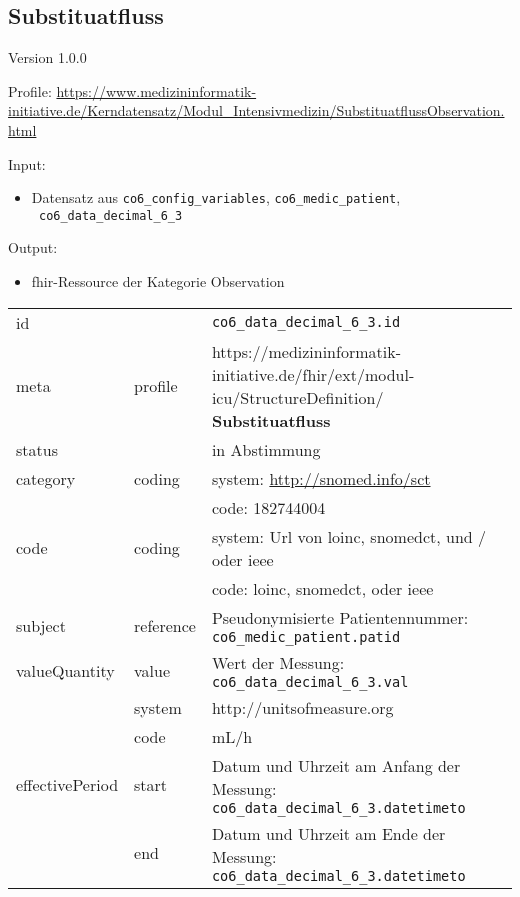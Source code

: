 \subsection{Substituatfluss} 
\noindent Version 1.0.0

\noindent Profile: \url{https://www.medizininformatik-initiative.de/Kerndatensatz/Modul_Intensivmedizin/SubstituatflussObservation.html}

\noindent Input:
\begin{itemize}
	\item Datensatz aus \texttt{co6\_config\_variables}, \texttt{co6\_medic\_patient}, \\ \texttt{
co6\_data\_decimal\_6\_3}
\end{itemize}
Output:
\begin{itemize}
        \item \ac{fhir}-Ressource der Kategorie \glqq Observation\grqq{}
\end{itemize}
\begin{longtable}{|l|l|p{7.5cm}|}
        \hline
        \rowcolor{lightgray} \multicolumn{3}{|l|}{Data Mapping (inhaltlich)} \\ \hline
        id &  & \texttt{co6\_data\_decimal\_6\_3.id} \\ \hline
	meta & profile & https://medizininformatik-initiative.de/fhir/ext/modul-icu/StructureDefinition/\textbf{
Substituatfluss} \\ \hline 
	status &  & in Abstimmung  \\ \hline 
	category & coding & system: \url{http://snomed.info/sct} \\
\cline{3-3}
	& & code: 182744004 \\ \hline
	code & coding & system: Url von \ac{loinc}, \ac{snomedct}, und / oder \ac{ieee} \\ 
	\cline{3-3} 
	 &  & code: \ac{loinc}, \ac{snomedct}, oder \ac{ieee} \\ \hline
	subject & reference & Pseudonymisierte Patientennummer: \texttt{co6\_medic\_patient.patid} \\ \hline
	valueQuantity & value & Wert der Messung: \texttt{
co6\_data\_decimal\_6\_3.val} \\
        \cline{2-3}
         & system & http://unitsofmeasure.org \\
         \cline{2-3}
         & code & mL/h \\ \hline
    effectivePeriod & start & Datum und Uhrzeit am Anfang der Messung: \texttt{
co6\_data\_decimal\_6\_3.datetimeto} \\
    \cline{2-3}
     & end & Datum und Uhrzeit am Ende der Messung: \texttt{
co6\_data\_decimal\_6\_3.datetimeto} \\ \hline
\end{longtable}


